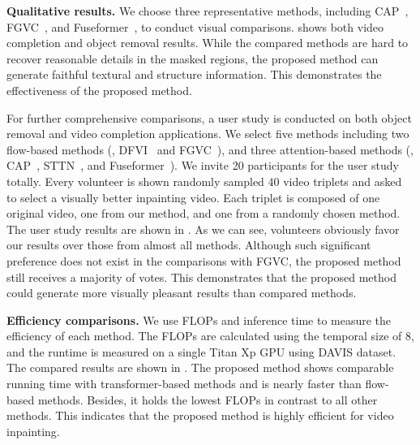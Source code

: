 \documentclass[final]{cvpr}
\newcommand{\subtitle}[1]{\noindent \textbf{#1}}
\begin{document}
\subtitle{Qualitative results.}
We choose three representative methods, including CAP~\cite{lee2019cpnet}, FGVC~\cite{Gao-ECCV-FGVC}, and Fuseformer~\cite{Liu_2021_FuseFormer}, to conduct visual comparisons.
 shows both video completion and object removal results.
While the compared methods are hard to recover reasonable details in the masked regions, the proposed method can generate faithful textural and structure information.
This demonstrates the effectiveness of the proposed method.

For further comprehensive comparisons, a user study is conducted on both object removal and video completion applications.
We select five methods including two flow-based methods (\ie, DFVI~\cite{Xu_2019_CVPR} and FGVC~\cite{Gao-ECCV-FGVC}), and three attention-based methods (\ie, CAP~\cite{lee2019cpnet}, STTN~\cite{yan2020sttn}, and Fuseformer~\cite{Liu_2021_FuseFormer}).
We invite 20 participants for the user study totally.
Every volunteer is shown randomly sampled 40 video triplets and asked to select a visually better inpainting video.
Each triplet is composed of one original video, one from our method, and one from a randomly chosen method. 
The user study results are shown in .
As we can see, volunteers obviously favor our results over those from almost all methods.
Although such significant preference does not exist in the comparisons with FGVC, the proposed method still receives a majority of votes.
This demonstrates that the proposed method could generate more visually pleasant results than compared methods.

\subtitle{Efficiency comparisons.}
We use FLOPs and inference time to measure the efficiency of each method.
The FLOPs are calculated using the temporal size of 8, and the runtime is measured on a single Titan Xp GPU using DAVIS dataset.
The compared results are shown in .
The proposed method shows comparable running time with transformer-based methods and is nearly  faster than flow-based methods.
Besides, it holds the lowest FLOPs in contrast to all other methods.
This indicates that the proposed method is highly efficient for video inpainting.
\end{document}
